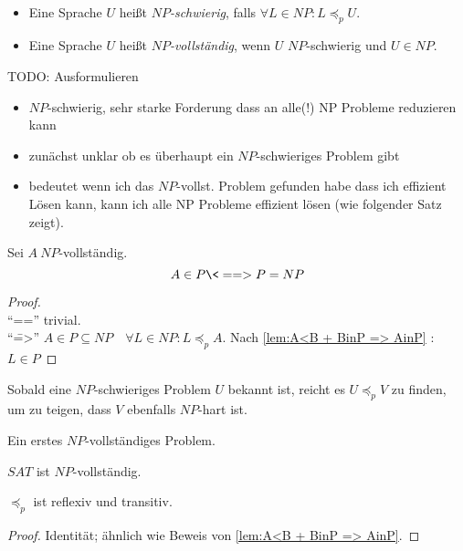 
\begin{Def}[name={[$NP$-schwierig und $NP$-vollständig]}]\
	\begin{itemize}
	\item Eine Sprache $U$ heißt \emph{$NP$-schwierig}, falls $\forall L\in NP : L\preceq_p U$.
	\item Eine Sprache $U$ heißt \emph{$NP$-vollständig}, wenn $U$ $NP$-schwierig und $U\in NP$. \qedhere
	\end{itemize}
\end{Def}

{\color{red}
TODO: Ausformulieren
\begin{itemize}
 \item $NP$-schwierig, sehr starke Forderung dass an alle(!) NP Probleme reduzieren kann
 \item zunächst unklar ob es überhaupt ein $NP$-schwieriges Problem gibt
 \item bedeutet wenn ich das $NP$-vollst. Problem gefunden habe dass ich effizient Lösen kann, kann ich alle NP Probleme effizient lösen (wie folgender Satz zeigt).
\end{itemize}
}
\begin{Satz}
	Sei $A\ NP$-vollständig.
	\[ A\in P \<==> P=NP \]
\end{Satz}
\begin{proof}\ \\
	"`\<=="' trivial.\\
	"`\==>"' $A\in P\subseteq NP\quad \forall L\in NP: L\preceq_p A$. Nach \autoref{lem:A<B + BinP => AinP} : $L\in P$
\end{proof}


\begin{Bem}
	Sobald eine $NP$-schwieriges Problem $U$ bekannt ist, reicht es $U\preceq_p V$ zu finden, um zu teigen, dass $V$ ebenfalls $NP$-hart ist.
\end{Bem}
Ein erstes $NP$-vollständiges Problem.

\begin{Satz}[Cook]
	$SAT$ ist $NP$-vollständig.
\end{Satz}

\begin{lemma}[name={[$\preceq_p$ ist reflexiv und transitiv]}]
	$\preceq_p$ ist reflexiv und transitiv.
\end{lemma}
\begin{proof}
	Identität; ähnlich wie Beweis von \autoref{lem:A<B + BinP => AinP}.
\end{proof}

